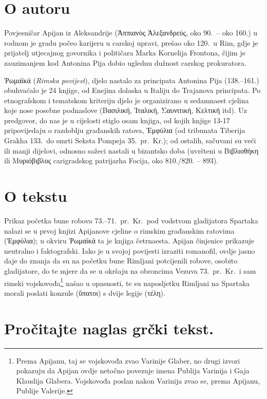 \section*{O autoru}

Povjesničar Apijan iz Aleksandrije (Ἀππιανὸς Ἀλεξανδρεύς, oko 90.\ – oko 160.) u rodnom je gradu počeo karijeru u carskoj upravi, prešao oko 120.\ u Rim, gdje je prijatelj utjecajnog govornika i političara Marka Kornelija Frontona, čijim je zauzimanjem kod Antonina Pija dobio uglednu dužnost carskog prokuratora.

Ῥωμαϊκά (\textit{Rimska povijest}), djelo nastalo za principata Antonina Pija (138.–161.) obuhvaćalo je 24 knjige, od Enejina dolaska u Italiju do Trajanova principata. Po etnografskom i tematskom kriteriju djelo je organizirano u sedamnaest cjelina koje nose posebne podnaslove (Βασιλική, Ἰταλική, Σαυνιτική, Κελτική itd). Uz predgovor, do nas je u cijelosti stiglo osam knjiga, od kojih knjige 13-17 pripovijedaju o razdoblju građanskih ratova, Ἐμφύλια (od tribunata Tiberija Grakha 133.\ do smrti Seksta Pompeja 35.\ pr.~Kr.); od ostalih, sačuvani su veći ili manji dijelovi, odnosno sažeci nastali u bizantsko doba (uvršteni u Βιβλιοθήκη ili Μυριόβιβλος carigradskog patrijarha Focija, oko 810./820. – 893).

\section*{O tekstu}

Prikaz početka bune robova 73.–71.\ pr.~Kr.\ pod vodstvom gladijatora Spartaka nalazi se u prvoj knjizi Apijanove cjeline o rimskim građanskim ratovima (Ἐμφύλια); u okviru Ῥωμαϊκά ta je knjiga četrnaesta. Apijan činjenice prikazuje neutralno i faktografski. Iako je u svojoj povijesti izraziti romanofil, ovdje jasno daje do znanja da su na početku bune Rimljani potcijenili robove, osobito gladijatore, do te mjere da se u okršaju na obroncima Vezuva 73.\ pr.~Kr.\ i sam rimski vojskovođa\footnote{Prema Apijanu, taj se vojskovođa zvao Varinije Glaber, no drugi izvori pokazuju da Apijan ovdje netočno povezuje imena Publija Varinija i Gaja Klaudija Glabera. Vojskovođa poslan nakon Varinija zvao se, prema Apijanu, Publije Valerije.} našao u opasnosti, te su naposljetku Rimljani na Spartaka morali poslati konzule (ὕπατοι) s dvije legije (τέλη).


\section*{Pročitajte naglas grčki tekst.}

